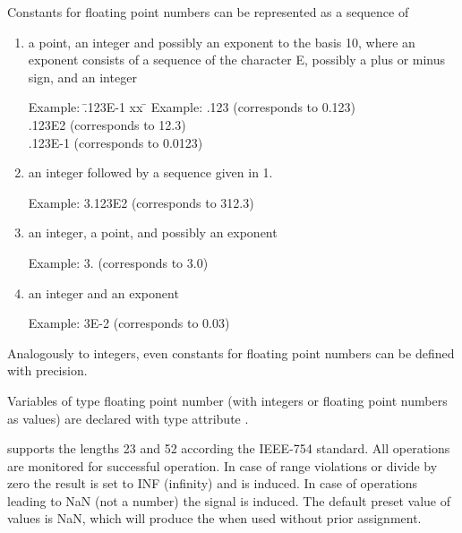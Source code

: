 Constants for floating point numbers can be represented as a sequence of
\begin{enumerate}
\item a point, an integer and possibly an exponent to the basis 10,
where an exponent consists of a sequence of the character E, possibly a
plus or minus sign, and an integer

\begin{tabbing}
Example: \= .123E-1 xx \=  \kill
Example: \> .123 \> (corresponds to 0.123)\\
 \> .123E2 \> (corresponds to 12.3)\\
 \> .123E-1 \> (corresponds to 0.0123)
\end{tabbing}

\item an integer followed by a sequence given in 1.

Example: 3.123E2 (corresponds to 312.3)

\item an integer, a point, and possibly an exponent

Example: 3. (corresponds to 3.0)

\item an integer and an exponent

Example: 3E-2 (corresponds to 0.03)
\end{enumerate}

Analogously to integers, even constants for floating point numbers can
be defined with precision.

Variables of type floating point number (with integers or floating point
numbers as values) are declared with type attribute .

\begin{grammarframe}

\end{grammarframe}


\OpenPEARL{} supports the lengths 23 and 52 according the IEEE-754 
standard.
All operations are monitored for successful operation.
In case of range violations or
divide by zero the result is set to INF (infinity) and
 is induced.
In case of operations leading to NaN (not a number) the signal
 is induced.
The default preset value of  values is NaN, which will produce
the  when used without prior assignment.

